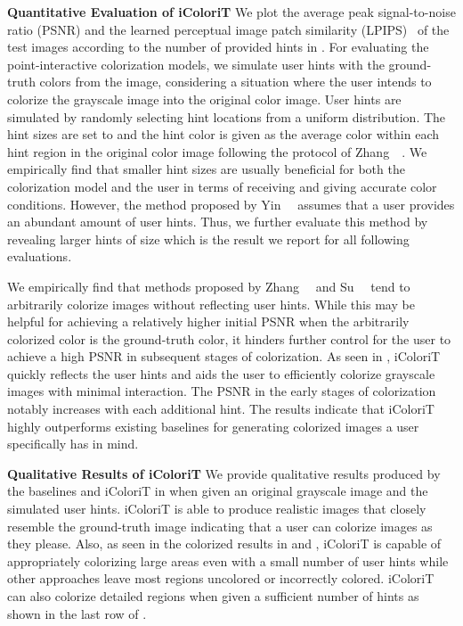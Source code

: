 \documentclass[10pt,twocolumn,letterpaper]{article}
\begin{document}
\noindent \textbf{Quantitative Evaluation of iColoriT}
We plot the average peak signal-to-noise ratio (PSNR) and the learned perceptual image patch similarity (LPIPS)~\cite{lpips} of the test images according to the number of provided hints in . 
For evaluating the point-interactive colorization models, we simulate user hints with the ground-truth colors from the image, considering a situation where the user intends to colorize the grayscale image into the original color image. 
User hints are simulated by randomly selecting hint locations from a uniform distribution. 
The hint sizes are set to  and the hint color is given as the average color within each hint region in the original color image following the protocol of Zhang~\etal~\cite{zhang2017}. 
We empirically find that smaller hint sizes are usually beneficial for both the colorization model and the user in terms of receiving and giving accurate color conditions. 
However, the method proposed by Yin~\etal~\cite{side} assumes that a user provides an abundant amount of user hints. 
Thus, we further evaluate this method by revealing larger hints of size  which is the result we report for all following evaluations. 

We empirically find that methods proposed by Zhang~\etal~\cite{zhang2017} and Su~\etal~\cite{instanceaware} tend to arbitrarily colorize images without reflecting user hints.
While this may be helpful for achieving a relatively higher initial PSNR when the arbitrarily colorized color is the ground-truth color, it hinders further control for the user to achieve a high PSNR in subsequent stages of colorization. 
As seen in , iColoriT quickly reflects the user hints and aids the user to efficiently colorize grayscale images with minimal interaction. 
The PSNR in the early stages of colorization notably increases with each additional hint. 
The results indicate that iColoriT highly outperforms existing baselines for generating colorized images a user specifically has in mind. 


\noindent \textbf{Qualitative Results of iColoriT}
\label{sec:quali}
We provide qualitative results produced by the baselines and iColoriT in  when given an original grayscale image and the simulated user hints. 
iColoriT is able to produce realistic images that closely resemble the ground-truth image indicating that a user can colorize images as they please. 
Also, as seen in the colorized results in  and , iColoriT is capable of appropriately colorizing large areas even with a small number of user hints while other approaches leave most regions uncolored or incorrectly colored. 
iColoriT can also colorize detailed regions when given a sufficient number of hints as shown in the last row of .
\end{document}
